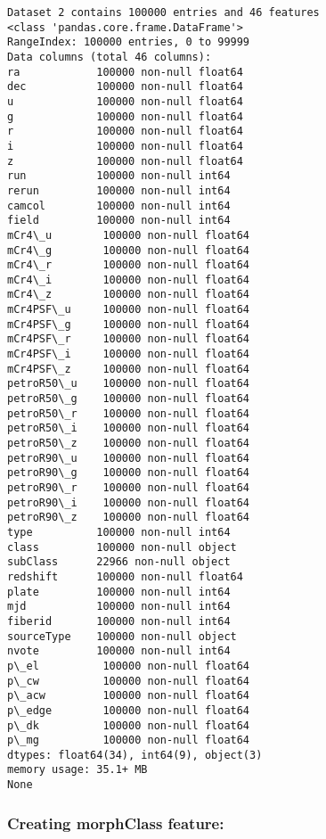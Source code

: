 \documentclass[11pt]{article}
\begin{document}
    \begin{Verbatim}[commandchars=\\\{\}]
Dataset 2 contains 100000 entries and 46 features
<class 'pandas.core.frame.DataFrame'>
RangeIndex: 100000 entries, 0 to 99999
Data columns (total 46 columns):
ra            100000 non-null float64
dec           100000 non-null float64
u             100000 non-null float64
g             100000 non-null float64
r             100000 non-null float64
i             100000 non-null float64
z             100000 non-null float64
run           100000 non-null int64
rerun         100000 non-null int64
camcol        100000 non-null int64
field         100000 non-null int64
mCr4\_u        100000 non-null float64
mCr4\_g        100000 non-null float64
mCr4\_r        100000 non-null float64
mCr4\_i        100000 non-null float64
mCr4\_z        100000 non-null float64
mCr4PSF\_u     100000 non-null float64
mCr4PSF\_g     100000 non-null float64
mCr4PSF\_r     100000 non-null float64
mCr4PSF\_i     100000 non-null float64
mCr4PSF\_z     100000 non-null float64
petroR50\_u    100000 non-null float64
petroR50\_g    100000 non-null float64
petroR50\_r    100000 non-null float64
petroR50\_i    100000 non-null float64
petroR50\_z    100000 non-null float64
petroR90\_u    100000 non-null float64
petroR90\_g    100000 non-null float64
petroR90\_r    100000 non-null float64
petroR90\_i    100000 non-null float64
petroR90\_z    100000 non-null float64
type          100000 non-null int64
class         100000 non-null object
subClass      22966 non-null object
redshift      100000 non-null float64
plate         100000 non-null int64
mjd           100000 non-null int64
fiberid       100000 non-null int64
sourceType    100000 non-null object
nvote         100000 non-null int64
p\_el          100000 non-null float64
p\_cw          100000 non-null float64
p\_acw         100000 non-null float64
p\_edge        100000 non-null float64
p\_dk          100000 non-null float64
p\_mg          100000 non-null float64
dtypes: float64(34), int64(9), object(3)
memory usage: 35.1+ MB
None

    \end{Verbatim}

    \subsubsection{Creating morphClass
feature:}\label{creating-morphclass-feature}
\end{document}
